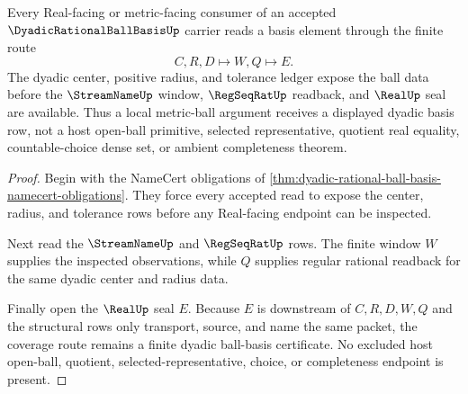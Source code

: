 \begin{theorem}
\label{thm:dyadic-rational-ball-basis-real-coverage}
Every Real-facing or metric-facing consumer of an accepted $\DyadicRationalBallBasisUp$ carrier reads a basis element through the finite route
$$
C,R,D \longmapsto W,Q \longmapsto E .
$$
The dyadic center, positive radius, and tolerance ledger expose the ball data before the $\StreamNameUp$ window, $\RegSeqRatUp$ readback, and $\RealUp$ seal are available. Thus a local metric-ball argument receives a displayed dyadic basis row, not a host open-ball primitive, selected representative, quotient real equality, countable-choice dense set, or ambient completeness theorem.
\end{theorem}
\begin{proof}
Begin with the NameCert obligations of \autoref{thm:dyadic-rational-ball-basis-namecert-obligations}. They force every accepted read to expose the center, radius, and tolerance rows before any Real-facing endpoint can be inspected.

Next read the $\StreamNameUp$ and $\RegSeqRatUp$ rows. The finite window $W$ supplies the inspected observations, while $Q$ supplies regular rational readback for the same dyadic center and radius data.

Finally open the $\RealUp$ seal $E$. Because $E$ is downstream of $C,R,D,W,Q$ and the structural rows only transport, source, and name the same packet, the coverage route remains a finite dyadic ball-basis certificate. No excluded host open-ball, quotient, selected-representative, choice, or completeness endpoint is present.
\end{proof}


\begin{closurestatus}{\DyadicRationalBallBasisUp}
  \theoryclosure{\seedClosure}
  \formalstatus{\unformalizedV}
\end{closurestatus}
